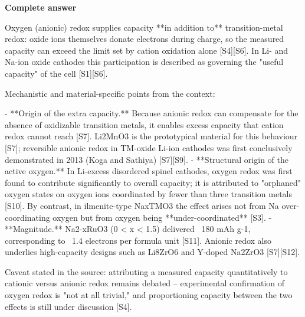 \documentclass[10pt]{article}
\begin{document}
\textbf{Complete answer}
\begin{AnswerText}
Oxygen (anionic) redox supplies capacity **in addition to** transition-metal redox: oxide ions themselves donate electrons during charge, so the measured capacity can exceed the limit set by cation oxidation alone [S4][S6]. In Li- and Na-ion oxide cathodes this participation is described as governing the "useful capacity" of the cell [S1][S6].

Mechanistic and material-specific points from the context:

- **Origin of the extra capacity.** Because anionic redox can compensate for the absence of oxidizable transition metals, it enables excess capacity that cation redox cannot reach [S7]. Li2MnO3 is the prototypical material for this behaviour [S7]; reversible anionic redox in TM-oxide Li-ion cathodes was first conclusively demonstrated in 2013 (Koga and Sathiya) [S7][S9].
- **Structural origin of the active oxygen.** In Li-excess disordered spinel cathodes, oxygen redox was first found to contribute significantly to overall capacity; it is attributed to "orphaned" oxygen states on oxygen ions coordinated by fewer than three transition metals [S10]. By contrast, in ilmenite-type NaxTMO3 the effect arises not from Na over-coordinating oxygen but from oxygen being **under-coordinated** [S3].
- **Magnitude.** Na2-xRuO3 (0 < x < 1.5) delivered ~180 mAh g-1, corresponding to ~1.4 electrons per formula unit [S11]. Anionic redox also underlies high-capacity designs such as Li8ZrO6 and Y-doped Na2ZrO3 [S7][S12].

Caveat stated in the source: attributing a measured capacity quantitatively to cationic versus anionic redox remains debated -- experimental confirmation of oxygen redox is "not at all trivial," and proportioning capacity between the two effects is still under discussion [S4].
\end{AnswerText}
\end{document}
